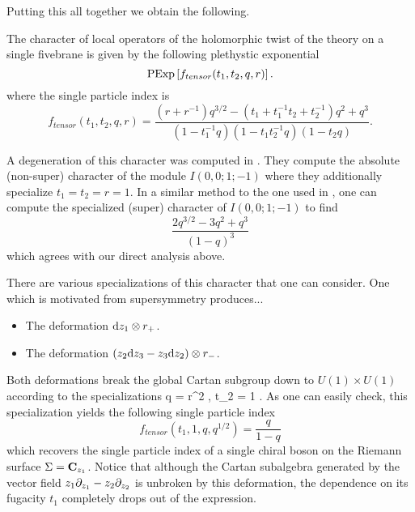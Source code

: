\documentclass[11pt]{amsart}
\begin{document}
Putting this all together we obtain the following.

\begin{prop}
The character of local operators of the holomorphic twist of the theory on a single fivebrane is given by the following plethystic exponential
\[
{\rm PExp} \left[f_{tensor} (t_1,t_2,q,r) \right] .
\]
where the single particle index is
\[
f_{tensor} (t_1,t_2,q,r) = \frac{(r + r^{-1})q^{3/2} - (t_1 + t_1^{-1} t_2 + t_2^{-1} )q^2 + q^3}{(1-t_1^{-1}q) (1-t_1 t_2^{-1} q) (1-t_2 q)} .
\]
\end{prop}

\parsec

A degeneration of this character was computed in \cite{KR1}. 
They compute the absolute (non-super) character of the module $I(0,0;1;-1)$ where they additionally specialize $t_1=t_2=r=1$. 
In a similar method to the one used in \cite{KR1}, one can compute the specialized (super) character of $I(0,0;1;-1)$ to find
\[
\frac{2 q^{3/2} - 3 q^2 + q^3}{(1-q)^3}
\]
which agrees with our direct analysis above.

\parsec

There are various specializations of this character that one can consider. 
One which is motivated from supersymmetry produces...

\begin{itemize}
\item The deformation ${\rm d} z_1 \otimes r_+$.
\item The deformation $(z_2 {\rm d} z_3 - z_3 {\rm d} z_2) \otimes r_-$. 
\end{itemize}

Both deformations break the global Cartan subgroup down to $U(1) \times U(1)$ according to the specializations
\beqn\label{eqn:special1}
q = r^2 , \quad t_2 = 1 .
\eeqn
As one can easily check, this specialization yields the following single particle index
\[
f_{tensor}(t_1, 1, q, q^{1/2}) = \frac{q}{1-q} 
\]
which recovers the single particle index of a single chiral boson on the Riemann surface $\Sigma = \mathbf{C}_{z_1}$. 
Notice that although the Cartan subalgebra generated by the vector field $z_1 \partial_{z_1} - z_2 \partial_{z_2}$ is unbroken by this deformation, the dependence on its fugacity $t_1$ completely drops out of the expression.
\end{document}
